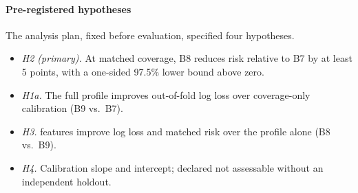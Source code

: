 \paragraph*{Pre-registered hypotheses} The analysis plan, fixed before evaluation, specified four hypotheses.
\begin{itemize}
\item \emph{H2 (primary).} At matched coverage, B8 reduces risk relative to B7 by at least 5 points, with a one-sided 97.5\% lower bound above zero.
\item \emph{H1a.} The full profile improves out-of-fold log loss over coverage-only calibration (B9 vs.\ B7).
\item \emph{H3.} \ers{} features improve log loss and matched risk over the profile alone (B8 vs.\ B9).
\item \emph{H4.} Calibration slope and intercept; declared not assessable without an independent holdout.
\end{itemize}
